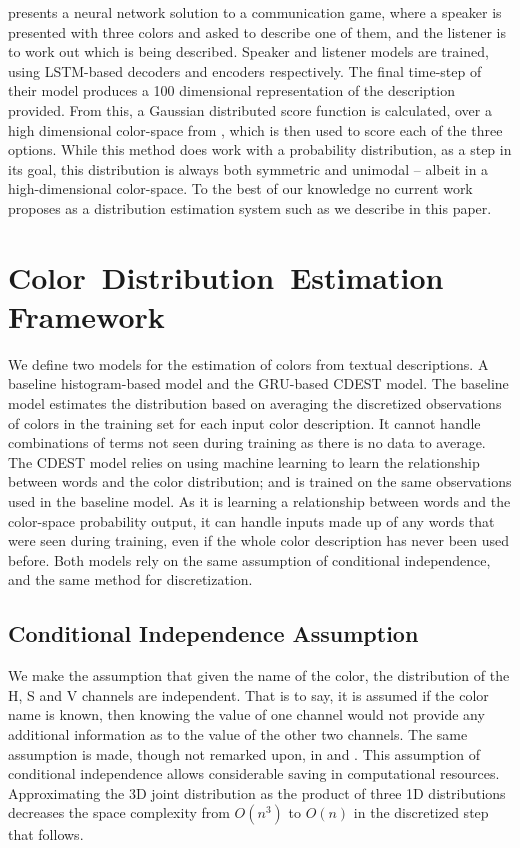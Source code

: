 \documentclass[11pt,a4paper]{article}
\newcommand{\textcite}{\citet}
\begin{document}
\textcite{DBLP:journals/corr/MonroeHGP17} presents a neural network solution to a communication game, where a speaker is presented with three colors and asked to describe one of them, and the listener is to work out which is being described.
Speaker and listener models are trained, using LSTM-based decoders and encoders respectively.
The final time-step of their model produces a 100 dimensional representation of the description provided.
From this, a Gaussian distributed score function is calculated, over a high dimensional color-space from \textcite{2016arXiv160603821M}, which is then used to score each of the three options.
While this method does work with a probability distribution, as a step in its goal,
this distribution is always both symmetric and unimodal -- albeit in a high-dimensional color-space.
To the best of our knowledge no current work proposes as a distribution estimation system such as we describe in this paper.

\section{Color~Distribution~Estimation Framework}\label{sec:method}
We define two models for the estimation of colors from textual descriptions.
A baseline histogram-based model and the GRU-based CDEST model.
The baseline model estimates the distribution based on averaging the discretized observations of colors in the training set for each input color description.
It cannot handle combinations of terms not seen during training as there is no data to average.
The CDEST model relies on using machine learning to learn the relationship between words and the color distribution; and is trained on the same observations used in the baseline model.
As it is learning a relationship between words and the color-space probability output, it can handle inputs made up of any words that were seen during training, even if the whole color description has never been used before.
Both models rely on the same assumption of conditional independence, and the same method for discretization.

\subsection{Conditional Independence Assumption}\label{sec:conditional-independence-assumption}
We make the assumption that given the name of the color, the distribution of the H, S and V channels are independent.
That is to say, it is assumed if the color name is known, then  knowing the value of one channel would not provide any additional information as to the value of the other two channels.
The same assumption is made, though not remarked upon, in \textcite{meomcmahanstone:color} and \textcite{mcmahan2015bayesian}.
This assumption of conditional independence allows considerable saving in computational resources.
Approximating the 3D joint distribution as the product of three 1D distributions decreases the space complexity from $O(n^3)$ to $O(n)$ in the discretized step that follows.
\end{document}
